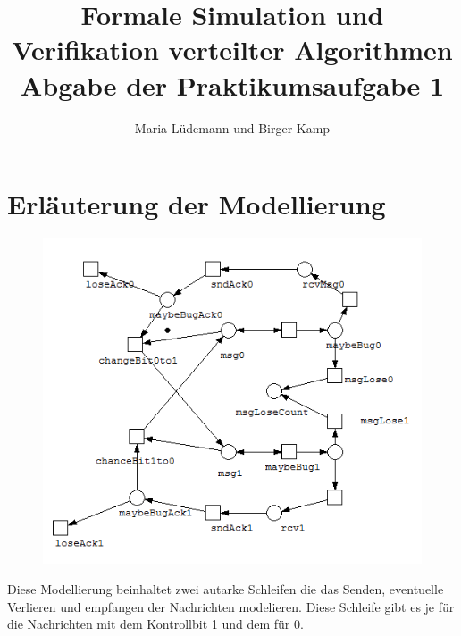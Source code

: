 \documentclass[]{scrartcl}
\title{Formale Simulation und Verifikation verteilter Algorithmen  \\ Abgabe der Praktikumsaufgabe 1}
\author{Maria Lüdemann und Birger Kamp}
\begin{document}
\maketitle

\begin{abstract}

\end{abstract}

\section{Erläuterung der Modellierung}
\begin{figure}[htbp]
	\centering
	\includegraphics[width=1\linewidth]{altBitPro.png}
	\label{fig:bspModell}
\end{figure}

Diese Modellierung beinhaltet zwei autarke Schleifen die das Senden, eventuelle Verlieren und empfangen der Nachrichten modelieren. Diese Schleife gibt es je für die Nachrichten mit dem Kontrollbit 1 und dem für 0. 
\end{document}

